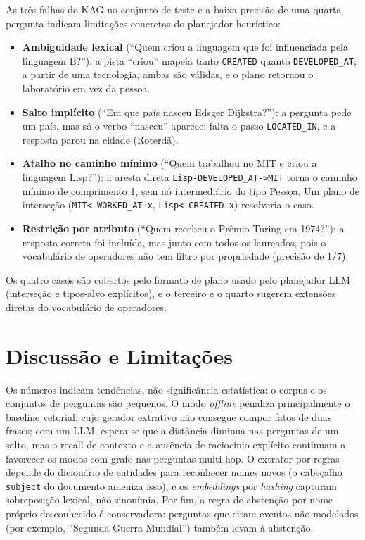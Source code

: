 \documentclass[12pt]{article}
\begin{document}
As três falhas do KAG no conjunto de teste e a baixa precisão de uma quarta pergunta indicam limitações concretas do planejador heurístico:
\begin{itemize}
  \item \textbf{Ambiguidade lexical} (``Quem criou a linguagem que foi influenciada pela linguagem B?''): a pista ``criou'' mapeia tanto \texttt{CREATED} quanto \texttt{DEVELOPED\_AT}; a partir de uma tecnologia, ambas são válidas, e o plano retornou o laboratório em vez da pessoa.
  \item \textbf{Salto implícito} (``Em que país nasceu Edsger Dijkstra?''): a pergunta pede um país, mas só o verbo ``nasceu'' aparece; falta o passo \texttt{LOCATED\_IN}, e a resposta parou na cidade (Roterdã).
  \item \textbf{Atalho no caminho mínimo} (``Quem trabalhou no MIT e criou a linguagem Lisp?''): a aresta direta \texttt{Lisp-DEVELOPED\_AT->MIT} torna o caminho mínimo de comprimento 1, sem nó intermediário do tipo Pessoa. Um plano de interseção (\texttt{MIT<-WORKED\_AT-x}, \texttt{Lisp<-CREATED-x}) resolveria o caso.
  \item \textbf{Restrição por atributo} (``Quem recebeu o Prêmio Turing em 1974?''): a resposta correta foi incluída, mas junto com todos os laureados, pois o vocabulário de operadores não tem filtro por propriedade (precisão de 1/7).
\end{itemize}
Os quatro casos são cobertos pelo formato de plano usado pelo planejador LLM (interseção e tipos-alvo explícitos), e o terceiro e o quarto sugerem extensões diretas do vocabulário de operadores.

\section{Discussão e Limitações}

Os números indicam tendências, não significância estatística: o corpus e os conjuntos de perguntas são pequenos. O modo \textit{offline} penaliza principalmente o baseline vetorial, cujo gerador extrativo não consegue compor fatos de duas frases; com um LLM, espera-se que a distância diminua nas perguntas de um salto, mas o recall de contexto e a ausência de raciocínio explícito continuam a favorecer os modos com grafo nas perguntas multi-hop. O extrator por regras depende do dicionário de entidades para reconhecer nomes novos (o cabeçalho \texttt{subject} do documento ameniza isso), e os \textit{embeddings} por \textit{hashing} capturam sobreposição lexical, não sinonímia. Por fim, a regra de abstenção por nome próprio desconhecido é conservadora: perguntas que citam eventos não modelados (por exemplo, ``Segunda Guerra Mundial'') também levam à abstenção.
\end{document}
